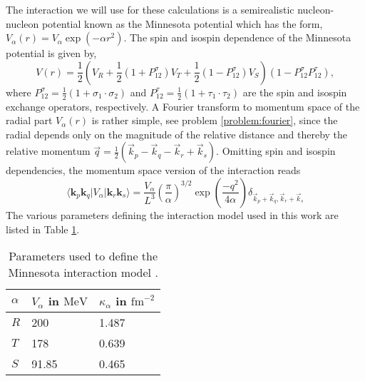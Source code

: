 \documentclass[thesis.tex]{subfiles}
\begin{document}
The interaction we will use for these calculations is a semirealistic
nucleon-nucleon potential known as the Minnesota potential
\cite{minnesota} which has the form, $V_{\alpha}\left(
r\right)=V_{\alpha}\exp{(-\alpha r^{2})}$. The spin and isospin
dependence of the Minnesota potential is given by,
\begin{equation*}
V\left( r\right)=\frac{1}{2}\left( V_{R}+\frac{1}{2}\left(
1+P_{12}^{\sigma}\right) V_{T}+\frac{1}{2}\left(
1-P_{12}^{\sigma}\right) V_{S}\right)\left(
1-P_{12}^{\sigma}P_{12}^{\tau}\right),
\end{equation*}
where $P_{12}^{\sigma}=\frac{1}{2}\left(
1+\sigma_{1}\cdot\sigma_{2}\right)$ and
$P_{12}^{\tau}=\frac{1}{2}\left( 1+\tau_{1}\cdot\tau_{2}\right)$ are
the spin and isospin exchange operators, respectively. A Fourier
transform to momentum space of the radial part $V_{\alpha}\left(
r\right)$ is rather simple, see problem \ref{problem:fourier}, since
the radial depends only on the magnitude of the relative distance and
thereby the relative momentum
$\vec{q}=\frac{1}{2}\left(\vec{k}_{p}-\vec{k}_{q}-\vec{k}_{r}+\vec{k}_{s}\right)$. Omitting
spin and isospin dependencies, the momentum space version of the
interaction reads
\begin{equation*}
\langle \mathbf{k}_p \mathbf{k}_q \vert V_{\alpha}\vert
\mathbf{k}_r\mathbf{k}_s\rangle=\frac{V_{\alpha}}{L^{3}}\left(\frac{\pi}{\alpha}\right)^{3/2}\exp{(\frac{-q^{2}}{4\alpha})}\delta_{\vec{k}_{p}+\vec{k}_{q},\vec{k}_{r}+\vec{k}_{s}}
\end{equation*}
The various parameters defining the interaction model used in this
work are listed in Table \ref{tab:minnesotatab}.
\begin{table}
\caption{Parameters used to define the Minnesota interaction model
  \cite{minnesota}.}\label{tab:minnesotatab}
\begin{center}
  \begin{tabular}{| l | l | l |}
    \hline $\alpha$ & $V_{\alpha}$ in $\mathrm{MeV}$ & $\kappa_{\alpha}$ in $\mathrm{fm}^{-2}$  \\ \hline $R$ &
    200  & 1.487 \\ \hline $T$ & 178
     & 0.639 \\ \hline $S$ & 91.85
    & 0.465  \\ \hline
  \end{tabular}
\end{center}
\end{table}
\end{document}
